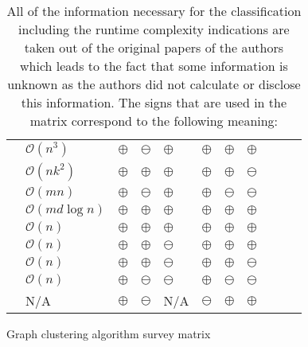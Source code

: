 \documentclass[12pt,a4paper]{report}
\begin{document}
\begin{table}[ht!]
\def\arraystretch{1.60}
\begin{tabularx}{\textwidth}{|Y||p{2.5cm}|Y|Y|Y|Y|Y|Y|Y|Y|Y|}
 \hline
  &  &  &  &  &  &  &  \\
 \hline\hline
 \cite{girvan2002community}     & \(\mathcal{O}(n^3)\)          & $\oplus$  & $\ominus$  & $\oplus$   & $\oplus$  & $\oplus$  & $\oplus$ \\\hline
 \cite{vandongen2000graph}      & \(\mathcal{O}(nk^2)\)         & $\oplus$  & $\oplus$   & $\oplus$   & $\oplus$  & $\oplus$  & $\ominus$ \\\hline
 \cite{pons2005computing}       & \(\mathcal{O}(mn)\)           & $\oplus$  & $\ominus$  & $\oplus$   & $\oplus$  & $\ominus$ & $\ominus$ \\\hline
 \cite{clauset2004modularity}   & \(\mathcal{O}(md \log{n})\)   & $\oplus$  & $\oplus$   & $\oplus$   & $\oplus$  & $\oplus$  & $\oplus$ \\\hline
 \cite{blondel2008modularity}   & \(\mathcal{O}(n)\)            & $\oplus$  & $\oplus$   & $\oplus$   & $\oplus$  & $\oplus$  & $\oplus$ \\\hline
 \cite{rosvall2008infomap}      & \(\mathcal{O}(n)\)            & $\oplus$  & $\oplus$   & $\ominus$  & $\oplus$  & $\oplus$  & $\oplus$ \\\hline
 \cite{biemann2006chinese}      & \(\mathcal{O}(n)\)            & $\oplus$  & $\oplus$   & $\ominus$  & $\oplus$  & $\oplus$  & $\ominus$ \\\hline
 \cite{reichardt2004detecting}  & \(\mathcal{O}(n)\)            & $\oplus$  & $\ominus$  & $\ominus$  & $\oplus$  & $\ominus$ & $\ominus$ \\\hline
 \cite{donetti2004detecting}    & N/A                           & $\oplus$  & $\ominus$  & N/A        & $\ominus$  & $\oplus$  & $\oplus$ \\\hline
\end{tabularx}
\caption{Graph clustering algorithm survey matrix}
\caption*{\centering
  All of the information necessary for the classification including the
  runtime complexity indications are taken out of the original papers of the
  authors which leads to the fact that some information is unknown as
  the authors did not calculate or disclose this information.
  The signs that are used in the matrix correspond to the following meaning:
}
\end{table}
\end{document}
